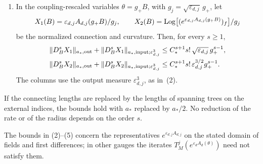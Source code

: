 \begin{theorem}
\begin{enumerate}
\[\]
of independent variables $(a,b,u,v)$ in a small ball extends holomorphically to $\varepsilon=0$, with value $v-u+[a,b]$ there, uniformly for $0\le\varepsilon\le1$.
\item In the coupling-rescaled variables $\theta=g_+B$, with $g_j=\sqrt{\varepsilon_{d,j}}\,g_+$, let
\[
 X_1(B)=\varepsilon_{d,j}A_{d,j}(g_+B)/g_j,\qquad
 X_2(B)=\operatorname{Log}\bigl[(e^{\varepsilon_{d,j}A_{d,j}(g_+B)})_f\bigr]/g_j
\]
be the normalized connection and curvature. Then, for every $s\ge1$,
\[
 \begin{aligned}
 \lVert D_B^sX_1\rVert_{a_*,\mathrm{out}}+\lVert D_B^sX_1\rVert_{a_*,\mathrm{input};\varepsilon_{d,j}^3}&\le C_*^{s+1}s!\,\sqrt{\varepsilon_{d,j}}\,g_+^{s-1},\\
 \lVert D_B^sX_2\rVert_{a_*,\mathrm{out}}+\lVert D_B^sX_2\rVert_{a_*,\mathrm{input};\varepsilon_{d,j}^3}&\le C_*^{s+1}s!\,\varepsilon_{d,j}^{3/2}g_+^{s-1}.
 \end{aligned}
\]
The columns use the output measure $\varepsilon_{d,j}^3$, as in~(2).
\end{enumerate}
If the connecting lengths are replaced by the lengths of spanning trees on the external indices, the bounds hold with $a_*$ replaced by $a_*/2$. No reduction of the rate or of the radius depends on the order $s$.
\end{theorem}

The bounds in (2)--(5) concern the representatives $e^{\varepsilon_{d,j}A_{d,j}}$ on the stated domain of fields and first differences; in other gauges the iterates $T_M^j(e^{\varepsilon_dA_d(\theta)})$ need not satisfy them.

